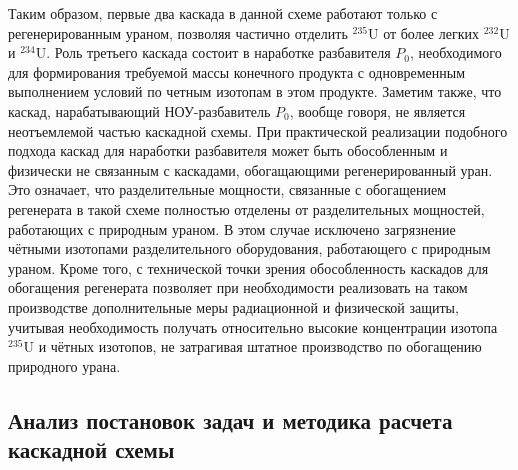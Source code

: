 Таким образом, первые два каскада в данной схеме работают только с регенерированным ураном, позволяя частично отделить $^{235}$U от более легких $^{232}$U и $^{234}$U. Роль третьего каскада состоит в наработке разбавителя $P_{0}$, необходимого для формирования требуемой массы конечного продукта с одновременным выполнением условий по четным изотопам в этом продукте. Заметим также, что каскад, нарабатывающий НОУ-разбавитель $P_{0}$, вообще говоря, не является неотъемлемой частью каскадной схемы. При практической реализации подобного подхода каскад для наработки разбавителя может быть обособленным и физически не связанным с каскадами, обогащающими регенерированный уран. Это означает, что разделительные мощности, связанные с обогащением регенерата в такой схеме полностью отделены от разделительных мощностей, работающих с природным ураном. В этом случае исключено загрязнение чётными изотопами разделительного оборудования, работающего с природным ураном. Кроме того, с технической точки зрения обособленность каскадов для обогащения регенерата позволяет при необходимости реализовать на таком производстве дополнительные меры радиационной и физической защиты, учитывая необходимость получать относительно высокие концентрации изотопа $^{235}$U и чётных изотопов, не затрагивая штатное производство по обогащению природного урана.


\subsection{Анализ постановок задач и методика расчета каскадной схемы}\label{statement}

